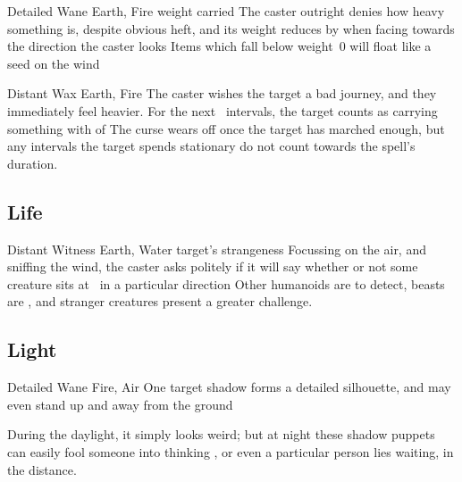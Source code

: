 \begin{multicols}{2}
  {Detailed}%
  {Wane}%
  {Earth, Fire}%
  {\gls{weight} carried}%
  {The caster outright denies how heavy something is, despite obvious heft, and its \gls{weight} reduces by  when facing towards the direction the caster looks}%
  {Items which fall below \gls{weight}~0 will float like a seed on the wind}

  {Distant}%
  {Wax}%
  {Earth, Fire}%
  {}%
  {The caster wishes the target a bad journey, and they immediately feel heavier.
  For the next ~\glspl{interval}, the target counts as carrying something with  of }%
  {
  The curse wears off once the target has marched enough, but any \glspl{interval} the target spends stationary do not count towards the spell's duration.}


\subsection{Life}


  {Distant}%
  {Witness}%
  {Earth, Water}%
  {target's strangeness}%
  {Focussing on the air, and sniffing the wind, the caster asks politely if it will say whether or not some creature sits at \spellRange\ in a particular direction}%
  {Other humanoids are \tn[7] to detect, beasts are \tn[9], and stranger creatures present a greater challenge.}

\subsection{Light}




  {Detailed}%
  {Wane}%
  {Fire, Air}%
  {}%
  {One target shadow forms a detailed silhouette, and may even stand up and away from the ground}%
  {During the daylight, it simply looks weird; but at night these shadow puppets can easily fool someone into thinking , or even a particular person lies waiting, in the distance.

}
\end{multicols}
